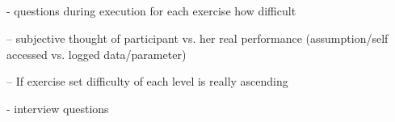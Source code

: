 \subsection{}
- questions during execution for each exercise how difficult

-- subjective thought of participant vs. her real performance (assumption/self accessed vs. logged data/parameter)

-- If exercise set difficulty of each level is really ascending

- interview questions


